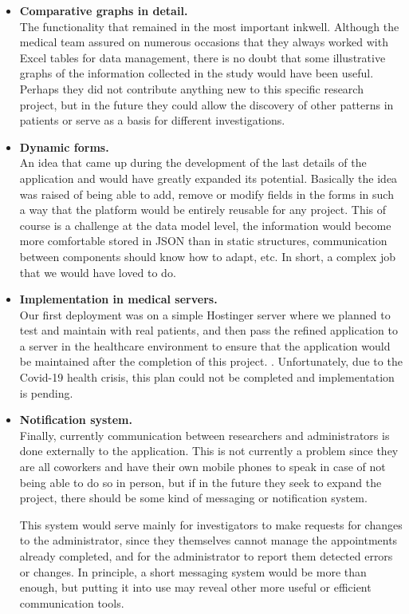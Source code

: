  \begin{itemize}
  \item\textbf{Comparative graphs in detail.} \\
The functionality that remained in the most important inkwell. Although the medical team assured on numerous occasions that they always worked with Excel tables for data management, there is no doubt that some illustrative graphs of the information collected in the study would have been useful. Perhaps they did not contribute anything new to this specific research project, but in the future they could allow the discovery of other patterns in patients or serve as a basis for different investigations. \\
  
  \item\textbf{Dynamic forms.} \\
  An idea that came up during the development of the last details of the application and would have greatly expanded its potential. Basically the idea was raised of being able to add, remove or modify fields in the forms in such a way that the platform would be entirely reusable for any project. This of course is a challenge at the data model level, the information would become more comfortable stored in JSON than in static structures, communication between components should know how to adapt, etc. In short, a complex job that we would have loved to do. \\
  
  \item\textbf{Implementation in medical servers.} \\
  Our first deployment was on a simple Hostinger server where we planned to test and maintain with real patients, and then pass the refined application to a server in the healthcare environment to ensure that the application would be maintained after the completion of this project. . Unfortunately, due to the Covid-19 health crisis, this plan could not be completed and implementation is pending.
  
  \item\textbf{Notification system.} \\
  Finally, currently communication between researchers and administrators is done externally to the application. This is not currently a problem since they are all coworkers and have their own mobile phones to speak in case of not being able to do so in person, but if in the future they seek to expand the project, there should be some kind of messaging or notification system.
  \newline
  
  This system would serve mainly for investigators to make requests for changes to the administrator, since they themselves cannot manage the appointments already completed, and for the administrator to report them detected errors or changes. In principle, a short messaging system would be more than enough, but putting it into use may reveal other more useful or efficient communication tools. \\

\end{itemize}
    
    
    
    
    
    